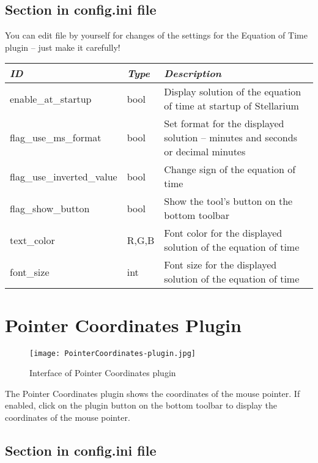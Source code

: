 \subsection{Section  in config.ini file}

You can edit  file by yourself for changes of the
settings for the Equation of Time plugin -- just make it carefully!

\noindent%
\begin{tabularx}{\textwidth}{l|l|X}\toprule
\emph{ID}            & \emph{Type} & \emph{Description}\\\midrule
enable\_at\_startup        & bool  & Display solution of the equation of time at startup of Stellarium\\%
flag\_use\_ms\_format      & bool  & Set format for the displayed solution -- minutes and seconds or decimal minutes\\%
flag\_use\_inverted\_value & bool  & Change sign of the equation of time \\%
flag\_show\_button         & bool  & Show the tool's button on the bottom toolbar\\%
text\_color                & R,G,B & Font color for the displayed solution of the equation of time\\%
font\_size                 & int   & Font size for the displayed solution of the equation of time \\\bottomrule
\end{tabularx}

\newpage

\section{Pointer Coordinates Plugin}
\label{sec:plugins:PointerCoordinates}


\begin{figure}[th]\centering
\texttt{[image: PointerCoordinates-plugin.jpg]}
\caption{Interface of Pointer Coordinates plugin}
\label{fig:PointerCoordinates}
\end{figure}

\noindent The Pointer Coordinates plugin shows the coordinates of the mouse pointer.
If enabled, click on the plugin button  on the bottom toolbar to display the coordinates of the mouse pointer.

\subsection{Section  in config.ini file}

